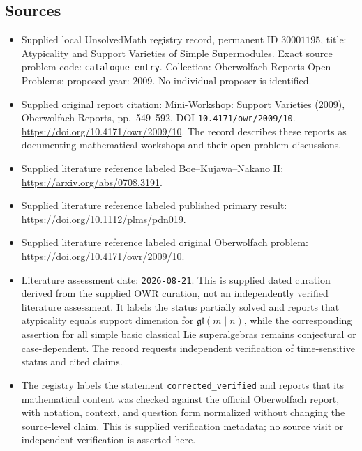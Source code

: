 \documentclass[11pt]{article}
\begin{document}
\subsection{Sources}
\begin{itemize}
\item Supplied local UnsolvedMath registry record, permanent ID \(30001195\), title: Atypicality and Support Varieties of Simple Supermodules. Exact source problem code: \texttt{catalogue entry}. Collection: Oberwolfach Reports Open Problems; proposed year: 2009. No individual proposer is identified.
\item Supplied original report citation: Mini-Workshop: Support Varieties (2009), Oberwolfach Reports, pp.\ 549--592, DOI \texttt{10.4171/owr/2009/10}. \url{https://doi.org/10.4171/owr/2009/10}. The record describes these reports as documenting mathematical workshops and their open-problem discussions.
\item Supplied literature reference labeled Boe--Kujawa--Nakano II: \url{https://arxiv.org/abs/0708.3191}.
\item Supplied literature reference labeled published primary result: \url{https://doi.org/10.1112/plms/pdn019}.
\item Supplied literature reference labeled original Oberwolfach problem: \url{https://doi.org/10.4171/owr/2009/10}.
\item Literature assessment date: \texttt{2026-08-21}. This is supplied dated curation derived from the supplied OWR curation, not an independently verified literature assessment. It labels the status partially solved and reports that atypicality equals support dimension for \(\mathfrak{gl}(m\mid n)\), while the corresponding assertion for all simple basic classical Lie superalgebras remains conjectural or case-dependent. The record requests independent verification of time-sensitive status and cited claims.
\item The registry labels the statement \texttt{corrected\_verified} and reports that its mathematical content was checked against the official Oberwolfach report, with notation, context, and question form normalized without changing the source-level claim. This is supplied verification metadata; no source visit or independent verification is asserted here.
\end{itemize}
\end{document}
